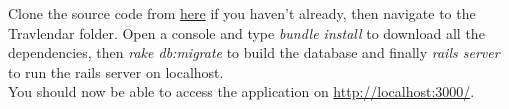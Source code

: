 Clone the source code from \href{https://github.com/TommasoBianchi/BettiBianchi_SWENG2}{here} if you haven't already, then navigate to the Travlendar folder. Open a console and type \emph{bundle install} to download all the dependencies, then \emph{rake db:migrate} to build the database and finally \emph{rails server} to run the rails server on localhost. \\
You should now be able to access the application on \href{http://localhost:3000/}{http://localhost:3000/}.